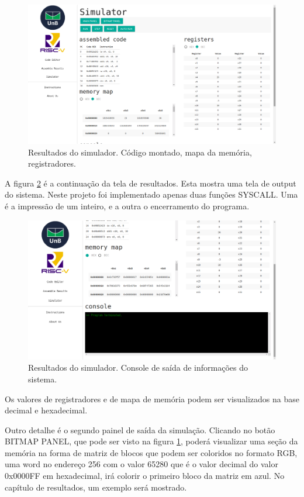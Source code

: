 	\begin{figure}[h!]
	  \includegraphics[width=\linewidth]{img/simulator_results_1.png}
	  \caption{Resultados do simulador. Código montado, mapa da memória, registradores. }
	  \label{fig:simulator_results_1}
	\end{figure}

	A figura \ref{fig:simulator_results_2} é a continuação da tela de resultados. Esta mostra uma tela de output do sistema. Neste projeto foi implementado apenas duas funções SYSCALL. Uma é a impressão de um inteiro, e a outra o encerramento do programa.  

	\begin{figure}[h!]
	  \includegraphics[width=\linewidth]{img/simulator_results_2.png}
	  \caption{Resultados do simulador. Console de saída de informações do sistema.}
	  \label{fig:simulator_results_2}
	\end{figure}

	Os valores de registradores e de mapa de memória podem ser visualizados na base decimal e hexadecimal.

	Outro detalhe é o segundo painel de saída da simulação. Clicando no botão BITMAP PANEL, que pode ser visto na figura \ref{fig:simulator_results_1}, poderá visualizar uma seção da memória na forma de matriz de blocos que podem ser coloridos no formato RGB, uma word no endereço 256 com o valor 65280 que é o valor decimal do valor 0x0000FF em hexadecimal, irá colorir o primeiro bloco da matriz em azul. No capítulo de resultados, um exemplo será mostrado.

